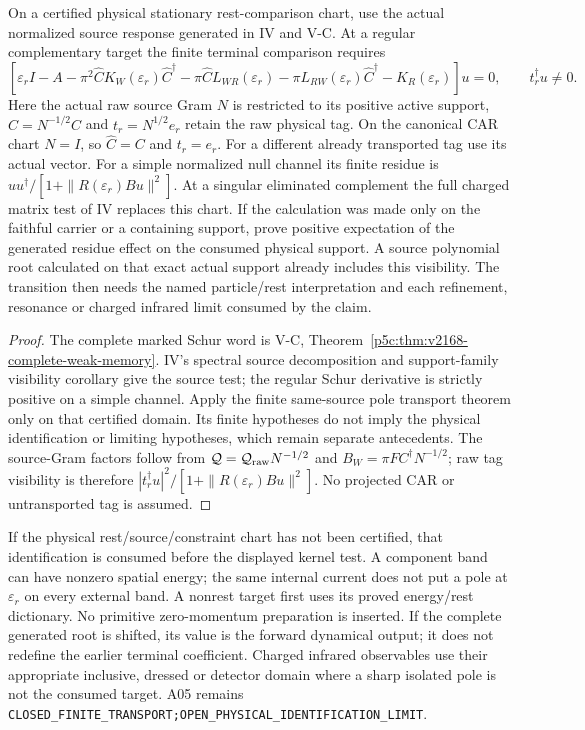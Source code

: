 \documentclass[12pt,a4paper]{article}
\begin{document}
\begin{proposition}
\label{p12:prop:v2168-physical-charged-pole-handoff}
On a certified physical stationary rest-comparison chart, use the actual
normalized source response generated in IV and V-C. At a regular
complementary target the finite terminal comparison requires
\[
 [\varepsilon_r I-A-\pi^2 \widehat C K_W(\varepsilon_r)\widehat C^\dagger
 -\pi \widehat C L_{WR}(\varepsilon_r)-\pi L_{RW}(\varepsilon_r)\widehat C^\dagger
 -K_R(\varepsilon_r)]u=0,
 \qquad t_r^\dagger u\ne0.
\]
Here the actual raw source Gram $N$ is restricted to its positive active
support, $\widehat C=N^{-1/2}C$ and $t_r=N^{1/2}e_r$ retain the raw
physical tag. On the canonical CAR chart $N=I$, so $\widehat C=C$ and
$t_r=e_r$. For a different already transported tag use its actual vector.
For a simple normalized null channel its finite residue is
$uu^\dagger/[1+\|R(\varepsilon_r)Bu\|^2]$. At a singular eliminated
complement the full charged matrix test of IV replaces this chart.
If the calculation was made only on the faithful carrier or a containing
support, prove positive expectation of the generated residue effect on the
consumed physical support. A source polynomial root calculated on that
exact actual support already includes this visibility.
The transition then needs the named particle/rest interpretation and each
refinement, resonance or charged infrared limit consumed by the claim.
\end{proposition}
\begin{proof}
The complete marked Schur word is V-C,
Theorem~\ref{p5c:thm:v2168-complete-weak-memory}. IV's spectral source
decomposition and support-family visibility corollary give the source
test; the regular Schur derivative is strictly positive on a simple
channel. Apply the finite same-source pole transport theorem only on
that certified domain. Its finite hypotheses do not imply the physical
identification or limiting hypotheses, which remain separate antecedents.
The source-Gram factors follow from
$\mathcal Q=\mathcal Q_{\rm raw}N^{-1/2}$ and
$B_W=\pi FC^\dagger N^{-1/2}$; raw tag visibility is therefore
$|t_r^\dagger u|^2/[1+\|R(\varepsilon_r)Bu\|^2]$. No projected CAR
or untransported tag is assumed.
\end{proof}

If the physical rest/source/constraint chart has not been certified,
that identification is consumed before the displayed kernel test.
A component band can have nonzero spatial energy; the same internal
current does not put a pole at $\varepsilon_r$ on every external band.
A nonrest target first uses its proved energy/rest dictionary. No primitive
zero-momentum preparation is inserted. If the complete generated root is
shifted, its value is the forward dynamical output; it does not redefine
the earlier terminal coefficient. Charged infrared observables use their
appropriate inclusive, dressed or detector domain where a sharp isolated
pole is not the consumed target. A05 remains
\texttt{CLOSED\_FINITE\_TRANSPORT;OPEN\_PHYSICAL\_IDENTIFICATION\_LIMIT}.
\end{document}
